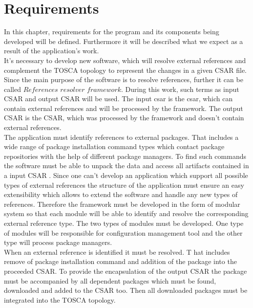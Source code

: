 
\chapter{Requirements}\label{chap:req}
In this chapter, requirements for the program and its components being developed will be defined.
Furthermore it will be described what we expect as a result of the application's work.\\
It's necessary to develop new software, which will resolve external references and complement the TOSCA topology to represent the changes in a given CSAR file.
Since the main purpose of the software is to resolve references, further it can be called $References$ $resolver$ $framework$.  
During this work, such terms as input CSAR and output CSAR will be used.
The input \gls{csar} is the \gls{csar}, which can contain external references and will be processed by the framework. %
The output CSAR is the CSAR, which was processed by the framework and doesn't contain external references. \\%
The application must identify references to external packages.
That includes a wide range of package installation command types which contact package repositories with the help of different package managers.
To find such commands the software must be able to unpack the data and access all artifacts contained in a input CSAR .
Since one can't develop an application which support all possible types of external references the structure of the application must ensure an easy extensibility which allows to extend the software and handle any new types of references.
Therefore the framework must be developed in the form of modular system so that each module will be able to identify and resolve the corresponding external reference type.
The two types of modules must be developed.
One type of modules will be responsible for configuration management tool and the other type will process package managers.\\
When an external reference is identified it must be resolved. T
hat includes remove of package installation command and addition of the package into the proceeded CSAR.
To provide the encapsulation of the output CSAR the package must be accompanied by all dependent packages which must be found, downloaded and added to the CSAR too.
Then all downloaded packages must be integrated into the TOSCA topology.
